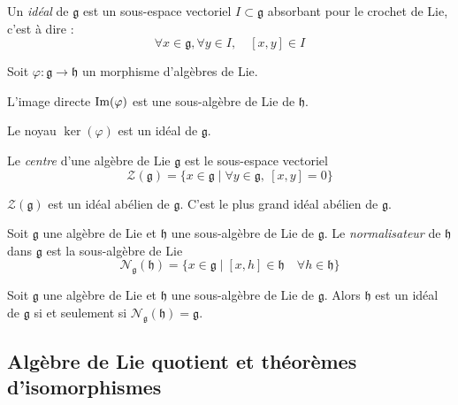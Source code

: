 \begin{definition}
    Un \emph{idéal} de $\mathfrak{g}$ est un sous-espace vectoriel $I \subset \mathfrak{g}$ absorbant pour le crochet de Lie, c'est à dire :
    $$\forall x \in \mathfrak{g}, \forall y \in I, \quad [x, y] \in I$$ 
\end{definition}

\begin{proposition}
    Soit $\varphi: \mathfrak{g} \to \mathfrak{h}$ un morphisme d'algèbres de Lie.
    \begin{ilist}
        \item L'image directe $\operatorname{Im}(\varphi)$ est une sous-algèbre de Lie de $\mathfrak{h}$.
        \item Le noyau $\ker(\varphi)$ est un idéal de $\mathfrak{g}$.
    \end{ilist}
\end{proposition}

\omitted

\begin{definition}
    Le \emph{centre} d'une algèbre de Lie $\mathfrak{g}$ est le sous-espace vectoriel
    $$\mathcal{Z}(\mathfrak{g}) = \{ x \in \mathfrak{g} \mid \forall y \in \mathfrak{g},\ [x, y] = 0 \}$$
\end{definition}

\begin{proposition}
    $\mathcal{Z}(\mathfrak{g})$ est un idéal abélien de $\mathfrak{g}$. C'est le plus grand idéal abélien de $\mathfrak{g}$.
\end{proposition}

\omitted

\begin{definition}
    Soit $\mathfrak{g}$ une algèbre de Lie et $\mathfrak{h}$ une sous-algèbre de Lie de $\mathfrak{g}$. Le \emph{normalisateur} de $\mathfrak{h}$ dans $\mathfrak{g}$ est la sous-algèbre de Lie 
    $$\mathcal{N}_\mathfrak{g}(\mathfrak{h}) = \{x\in \mathfrak{g} \mid [x, h] \in \mathfrak{h} \quad \forall h\in \mathfrak{h}\}$$
\end{definition}

\begin{proposition}
    Soit $\mathfrak{g}$ une algèbre de Lie et $\mathfrak{h}$ une sous-algèbre de Lie de $\mathfrak{g}$. Alors $\mathfrak{h}$ est un idéal de $\mathfrak{g}$ si et seulement si $\mathcal{N}_\mathfrak{g}(\mathfrak{h}) = \mathfrak{g}$.
\end{proposition}

\subsection{Algèbre de Lie quotient et théorèmes d'isomorphismes}

